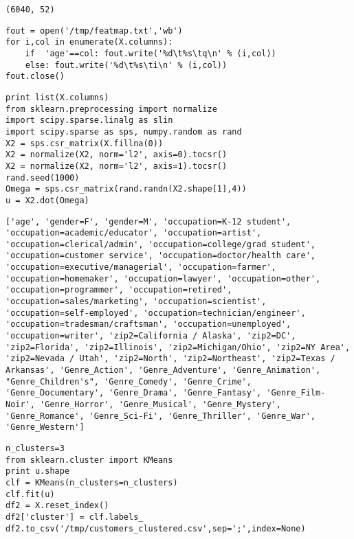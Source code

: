 \documentclass[12pt,fleqn]{article}\usepackage{../common}
\begin{document}
\begin{verbatim}
(6040, 52)
\end{verbatim}
\begin{verbatim}
fout = open('/tmp/featmap.txt','wb')
for i,col in enumerate(X.columns):
    if  'age'==col: fout.write('%d\t%s\tq\n' % (i,col))
    else: fout.write('%d\t%s\ti\n' % (i,col))    
fout.close()
\end{verbatim}

\begin{verbatim}
print list(X.columns)
from sklearn.preprocessing import normalize
import scipy.sparse.linalg as slin
import scipy.sparse as sps, numpy.random as rand
X2 = sps.csr_matrix(X.fillna(0))
X2 = normalize(X2, norm='l2', axis=0).tocsr()
X2 = normalize(X2, norm='l2', axis=1).tocsr()    
rand.seed(1000)
Omega = sps.csr_matrix(rand.randn(X2.shape[1],4))
u = X2.dot(Omega)
\end{verbatim}

\begin{verbatim}
['age', 'gender=F', 'gender=M', 'occupation=K-12 student', 'occupation=academic/educator', 'occupation=artist', 'occupation=clerical/admin', 'occupation=college/grad student', 'occupation=customer service', 'occupation=doctor/health care', 'occupation=executive/managerial', 'occupation=farmer', 'occupation=homemaker', 'occupation=lawyer', 'occupation=other', 'occupation=programmer', 'occupation=retired', 'occupation=sales/marketing', 'occupation=scientist', 'occupation=self-employed', 'occupation=technician/engineer', 'occupation=tradesman/craftsman', 'occupation=unemployed', 'occupation=writer', 'zip2=California / Alaska', 'zip2=DC', 'zip2=Florida', 'zip2=Illinois', 'zip2=Michigan/Ohio', 'zip2=NY Area', 'zip2=Nevada / Utah', 'zip2=North', 'zip2=Northeast', 'zip2=Texas / Arkansas', 'Genre_Action', 'Genre_Adventure', 'Genre_Animation', "Genre_Children's", 'Genre_Comedy', 'Genre_Crime', 'Genre_Documentary', 'Genre_Drama', 'Genre_Fantasy', 'Genre_Film-Noir', 'Genre_Horror', 'Genre_Musical', 'Genre_Mystery', 'Genre_Romance', 'Genre_Sci-Fi', 'Genre_Thriller', 'Genre_War', 'Genre_Western']
\end{verbatim}

\begin{verbatim}
n_clusters=3
from sklearn.cluster import KMeans
print u.shape
clf = KMeans(n_clusters=n_clusters)
clf.fit(u)    
df2 = X.reset_index()
df2['cluster'] = clf.labels_
df2.to_csv('/tmp/customers_clustered.csv',sep=';',index=None)
\end{verbatim}
\end{document}
